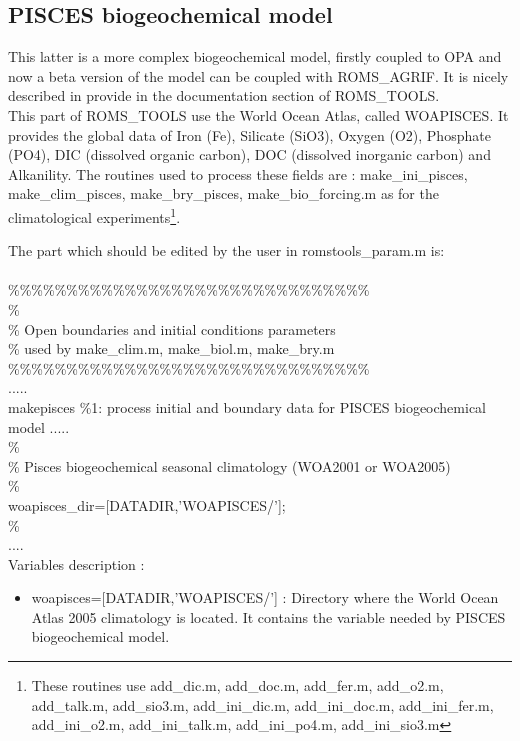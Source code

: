 \subsection{PISCES biogeochemical model}
This latter is a more complex biogeochemical model, firstly coupled to OPA and now a
beta version of the model can be coupled with ROMS\_AGRIF. It is nicely
described in \citep{AumontNoticePisces05} provide in the documentation section of
ROMS\_TOOLS. \\

This part of ROMS\_TOOLS use  the World Ocean Atlas, called WOAPISCES. It provides the global data of Iron (Fe), Silicate (SiO3), Oxygen (O2), Phosphate (PO4), DIC (dissolved organic
carbon), DOC (dissolved inorganic carbon) and Alkanility.  The routines used to process these fields are : make\_ini\_pisces, make\_clim\_pisces, make\_bry\_pisces, make\_bio\_forcing.m as for the climatological experiments\footnote{These routines use add\_dic.m, add\_doc.m, add\_fer.m, add\_o2.m, add\_talk.m, add\_sio3.m,
add\_ini\_dic.m, add\_ini\_doc.m, add\_ini\_fer.m, add\_ini\_o2.m, add\_ini\_talk.m, add\_ini\_po4.m, add\_ini\_sio3.m}. 

The part which should be edited by the user in  romstools\_param.m is:\\
\\ 
\%\%\%\%\%\%\%\%\%\%\%\%\%\%\%\%\%\%\%\%\%\%\%\%\%\%\%\%\%\%\%\\
\%\\
\% Open boundaries and initial conditions parameters\\
\%   used by make\_clim.m, make\_biol.m, make\_bry.m\\
\%\%\%\%\%\%\%\%\%\%\%\%\%\%\%\%\%\%\%\%\%\%\%\%\%\%\%\%\%\%\%\\
..... \\
makepisces \%1: process initial and boundary data for PISCES biogeochemical model
..... \\
\noindent \% \\
\% Pisces biogeochemical seasonal climatology (WOA2001 or WOA2005)  \\
\% \\
woapisces\_dir=[DATADIR,'WOAPISCES/']; \\
\%\\
.... \\

Variables description :
\begin{itemize}
\item woapisces=[DATADIR,'WOAPISCES/'] : Directory where the World Ocean
Atlas 2005 climatology is located. It contains the variable needed by PISCES biogeochemical model.
\end{itemize}

